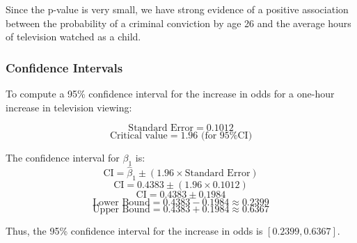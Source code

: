 \documentclass{article}
\begin{document}
Since the p-value is very small, we have strong evidence of a positive association between the probability of a criminal conviction by age 26 and the average hours of television watched as a child.

\subsubsection{Confidence Intervals}

To compute a 95\% confidence interval for the increase in odds for a one-hour increase in television viewing:

\[
\text{Standard Error} = 0.1012
\]
\[
\text{Critical value} = 1.96 \text{ (for 95\% CI)}
\]

The confidence interval for \(\beta_1\) is:
\[
\text{CI} = \hat{\beta}_1 \pm (1.96 \times \text{Standard Error})
\]
\[
\text{CI} = 0.4383 \pm (1.96 \times 0.1012)
\]
\[
\text{CI} = 0.4383 \pm 0.1984
\]
\[
\text{Lower Bound} = 0.4383 - 0.1984 \approx 0.2399
\]
\[
\text{Upper Bound} = 0.4383 + 0.1984 \approx 0.6367
\]

Thus, the 95\% confidence interval for the increase in odds is \([0.2399, 0.6367]\).
\end{document}
